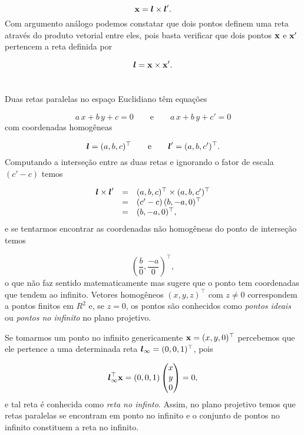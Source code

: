 \begin{equation*}
\mathbf{x}=\boldsymbol{l}\times\boldsymbol{l}'.
\end{equation*}
Com argumento análogo podemos constatar que dois pontos definem uma reta através do produto vetorial entre eles, pois basta verificar que dois pontos $\mathbf{x}$ e $\mathbf{x}'$ pertencem a reta definida por

\begin{equation*}
\boldsymbol{l}=\mathbf{x}\times\mathbf{x}'.
\end{equation*}\\



Duas retas paralelas no espaço Euclidiano têm equações

\begin{equation*}
a\,x+b\,y+c=0\qquad\text{e}\qquad a\,x+b\,y+c'=0
\end{equation*}
com coordenadas homogêneas

\begin{equation*}
\boldsymbol{l}=(a,b,c)^\top\qquad\text{e}\qquad\boldsymbol{l}'=(a,b,c')^\top.
\end{equation*}
Computando a interseção entre as duas retas e ignorando o fator de escala $(c'-c)$ temos

\begin{equation*}
\begin{array}{rcl}
\boldsymbol{l}\times\boldsymbol{l}'&=&(a,b,c)^\top\times(a,b,c')^\top\\
&=&(c'-c)\,(b,-a,0)^\top\\
&=&(b,-a,0)^\top,
\end{array}
\end{equation*}
e se tentarmos encontrar as coordenadas não homogêneas do ponto de interseção temos

\begin{equation*}
\left(\frac{b}{0},\frac{-a}{0}\right)^\top,
\end{equation*}
o que não faz sentido matematicamente mas sugere que o ponto tem coordenadas que tendem ao infinito. Vetores homogêneos $(x,y,z)^\top$ com $z\neq0$ correspondem a pontos finitos em $R^2$ e, se $z=0$, os pontos são conhecidos como \textit{pontos ideais} ou \textit{pontos no infinito} no plano projetivo.

Se tomarmos um ponto no infinito genericamente $\mathbf{x}=(x,y,0)^\top$ percebemos que ele pertence a uma determinada reta $\boldsymbol{l}_\infty=(0,0,1)^\top$, pois

\begin{equation*}
\boldsymbol{l}_\infty^\top \mathbf{x}=(0,0,1)
\begin{pmatrix}
x\\
y\\
0
\end{pmatrix}
=0,
\end{equation*} 
e tal reta é conhecida como \textit{reta no infinto}. Assim, no plano projetivo temos que retas paralelas se encontram em ponto no infinito e o conjunto de pontos no infinito constituem a reta no infinito.

